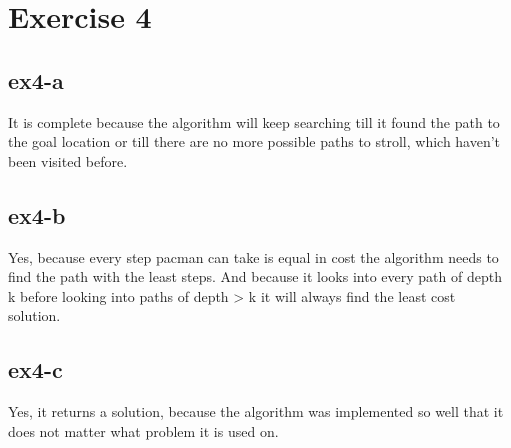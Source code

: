 \section{Exercise 4}
\subsection{ex4-a}
It is complete because the algorithm will keep searching till it found the path to the goal location or till there are no more
possible paths to stroll, which haven't been visited before.

\subsection{ex4-b}
Yes, because every step pacman can take is equal in cost the algorithm needs to find the path with the least steps.
And because it looks into every path of depth k before looking into paths of depth > k it will
always find the least cost solution.

\subsection{ex4-c}
Yes, it returns a solution, because the algorithm was implemented so well that it does not matter what problem it is used on.
